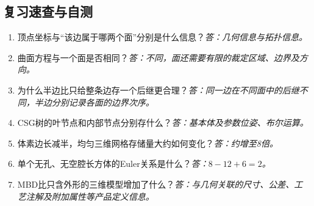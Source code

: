 \subsection*{复习速查与自测}
\begin{enumerate}
\item 顶点坐标与“该边属于哪两个面”分别是什么信息？\textit{答：几何信息与拓扑信息。}
\item 曲面方程与一个面是否相同？\textit{答：不同，面还需要有限的裁定区域、边界及方向。}
\item 为什么半边比只给整条边存一个后继更合理？\textit{答：同一边在不同面中的后继不同，半边分别记录各面的边界次序。}
\item CSG树的叶节点和内部节点分别存什么？\textit{答：基本体及参数位姿、布尔运算。}
\item 体素边长减半，均匀三维网格存储量大约如何变化？\textit{答：约增至8倍。}
\item 单个无孔、无空腔长方体的Euler关系是什么？\textit{答：$8-12+6=2$。}
\item MBD比只含外形的三维模型增加了什么？\textit{答：与几何关联的尺寸、公差、工艺注解及附加属性等产品定义信息。}
\end{enumerate}
